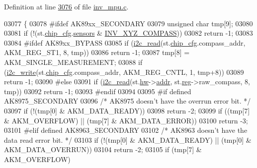 Definition at line \hyperlink{inv__mpu_8c_source_l03076}{3076} of file \hyperlink{inv__mpu_8c_source}{inv\+\_\+mpu.\+c}.


\begin{DoxyCode}
03077 \{
03078 \textcolor{preprocessor}{#ifdef AK89xx\_SECONDARY}
03079     \textcolor{keywordtype}{unsigned} \textcolor{keywordtype}{char} tmp[9];
03080 
03081     \textcolor{keywordflow}{if} (!(st.\hyperlink{structgyro__state__s_ac895217592e2084bd520b0be8e9d20ee}{chip\_cfg}.\hyperlink{structchip__cfg__s_aaa21c01566947e7007476657cb614e3f}{sensors} & \hyperlink{group___d_r_i_v_e_r_s_ga7fc9c1dbdcb2ac8cc2a4128a5799482a}{INV\_XYZ\_COMPASS}))
03082         \textcolor{keywordflow}{return} -1;
03083 
03084 \textcolor{preprocessor}{#ifdef AK89xx\_BYPASS}
03085     \textcolor{keywordflow}{if} (\hyperlink{_i2_c_8c_ac2d47e7a6c76f93f9b537c31a2986e7b}{i2c\_read}(st.\hyperlink{structgyro__state__s_ac895217592e2084bd520b0be8e9d20ee}{chip\_cfg}.compass\_addr, AKM\_REG\_ST1, 8, tmp))
03086         \textcolor{keywordflow}{return} -1;
03087     tmp[8] = AKM\_SINGLE\_MEASUREMENT;
03088     \textcolor{keywordflow}{if} (\hyperlink{_i2_c_8c_ac0f145afe8d662af199043939f4398d6}{i2c\_write}(st.\hyperlink{structgyro__state__s_ac895217592e2084bd520b0be8e9d20ee}{chip\_cfg}.compass\_addr, AKM\_REG\_CNTL, 1, tmp+8))
03089         \textcolor{keywordflow}{return} -1;
03090 \textcolor{preprocessor}{#else}
03091     \textcolor{keywordflow}{if} (\hyperlink{_i2_c_8c_ac2d47e7a6c76f93f9b537c31a2986e7b}{i2c\_read}(st.\hyperlink{structgyro__state__s_a5bac30a96752691e4cc723735060e360}{hw}->\hyperlink{structhw__s_a4c34a946600e9d68b6355d23f54d291b}{addr}, st.\hyperlink{structgyro__state__s_ae857e1285c583b7438a208edd691a38e}{reg}->raw\_compass, 8, tmp))
03092         \textcolor{keywordflow}{return} -1;
03093 \textcolor{preprocessor}{#endif}
03094 
03095 \textcolor{preprocessor}{#if defined AK8975\_SECONDARY}
03096     \textcolor{comment}{/* AK8975 doesn't have the overrun error bit. */}
03097     \textcolor{keywordflow}{if} (!(tmp[0] & AKM\_DATA\_READY))
03098         \textcolor{keywordflow}{return} -2;
03099     \textcolor{keywordflow}{if} ((tmp[7] & AKM\_OVERFLOW) || (tmp[7] & AKM\_DATA\_ERROR))
03100         \textcolor{keywordflow}{return} -3;
03101 \textcolor{preprocessor}{#elif defined AK8963\_SECONDARY}
03102     \textcolor{comment}{/* AK8963 doesn't have the data read error bit. */}
03103     \textcolor{keywordflow}{if} (!(tmp[0] & AKM\_DATA\_READY) || (tmp[0] & AKM\_DATA\_OVERRUN))
03104         \textcolor{keywordflow}{return} -2;
03105     \textcolor{keywordflow}{if} (tmp[7] & AKM\_OVERFLOW)

\end{DoxyCode}
